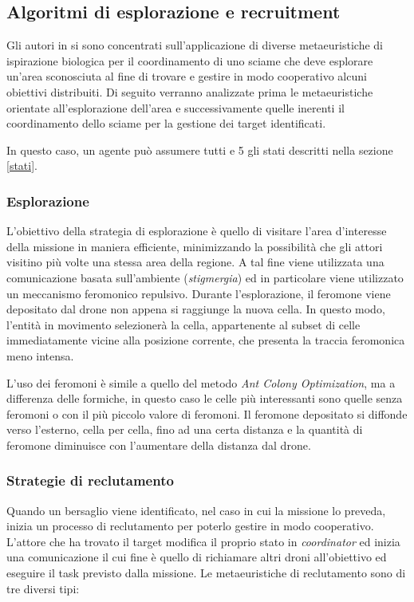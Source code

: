 \subsection{Algoritmi di esplorazione e recruitment}

Gli autori in \cite{palmieri2017comparison} si sono concentrati sull'applicazione di diverse metaeuristiche di ispirazione biologica per il coordinamento di uno sciame che deve esplorare un'area sconosciuta al fine di trovare e gestire in modo cooperativo alcuni obiettivi distribuiti.
Di seguito verranno analizzate prima le metaeuristiche orientate all'esplorazione dell'area e successivamente quelle inerenti il coordinamento dello sciame per la gestione dei target identificati.

In questo caso, un agente può assumere tutti e 5 gli stati descritti nella sezione \ref{stati}.

\subsubsection{Esplorazione}

L'obiettivo della strategia di esplorazione è quello di visitare l'area d'interesse della missione in maniera efficiente, minimizzando la possibilità che gli attori visitino più volte una stessa area della regione.
A tal fine viene utilizzata una comunicazione basata sull'ambiente (\textit{stigmergia}) ed in particolare viene utilizzato un meccanismo feromonico repulsivo.
Durante l'esplorazione, il feromone viene depositato dal drone non appena si raggiunge la nuova cella. 
In questo modo, l'entità in movimento selezionerà la cella, appartenente al subset di celle immediatamente vicine alla posizione corrente, che presenta la traccia feromonica meno intensa.

L'uso dei feromoni è simile a quello del metodo \textit{Ant Colony Optimization}, ma a differenza delle formiche, in questo caso le celle più interessanti sono quelle senza feromoni o con il più piccolo valore di feromoni. 
Il feromone depositato si diffonde verso l'esterno, cella per cella, fino ad una certa distanza  e la quantità di feromone diminuisce con l'aumentare della distanza dal drone.


\subsubsection{Strategie di reclutamento}

Quando un bersaglio viene identificato, nel caso in cui la missione lo preveda, inizia un processo di reclutamento per poterlo gestire in modo cooperativo.
L'attore che ha trovato il target modifica il proprio stato in \textit{coordinator} ed inizia una comunicazione il cui fine è quello di richiamare altri droni all'obiettivo ed eseguire il task previsto dalla missione. 
Le metaeuristiche di reclutamento sono di tre diversi tipi:

